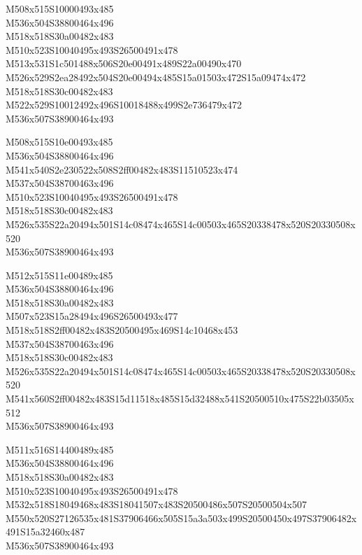 \documentclass{article}
\begin{document}
\begin{multicols}{5}
\begin{center}

M508x515S10000493x485 %
\\M536x504S38800464x496 %
\\M518x518S30a00482x483 %
\\M510x523S10040495x493S26500491x478 %
\\M513x531S1c501488x506S20e00491x489S22a00490x470 %
\\M526x529S2ea28492x504S20e00494x485S15a01503x472S15a09474x472 %
\\M518x518S30c00482x483 %
\\M522x529S10012492x496S10018488x499S2e736479x472 %
\\M536x507S38900464x493 %
\vfil
\columnbreak

M508x515S10e00493x485 %
\\M536x504S38800464x496 %
\\M541x540S2e230522x508S2ff00482x483S11510523x474 %
\\M537x504S38700463x496 %
\\M510x523S10040495x493S26500491x478 %
\\M518x518S30c00482x483 %
\\M526x535S22a20494x501S14c08474x465S14c00503x465S20338478x520S20330508x520 %
\\M536x507S38900464x493 %
\vfil
\columnbreak

M512x515S11e00489x485 %
\\M536x504S38800464x496 %
\\M518x518S30a00482x483 %
\\M507x523S15a28494x496S26500493x477 %
\\M518x518S2ff00482x483S20500495x469S14c10468x453 %
\\M537x504S38700463x496 %
\\M518x518S30c00482x483 %
\\M526x535S22a20494x501S14c08474x465S14c00503x465S20338478x520S20330508x520 %
\\M541x560S2ff00482x483S15d11518x485S15d32488x541S20500510x475S22b03505x512 %
\\M536x507S38900464x493 %
\vfil
\columnbreak

M511x516S14400489x485 %
\\M536x504S38800464x496 %
\\M518x518S30a00482x483 %
\\M510x523S10040495x493S26500491x478 %
\\M532x518S18049468x483S18041507x483S20500486x507S20500504x507 %
\\M550x520S27126535x481S37906466x505S15a3a503x499S20500450x497S37906482x491S15a32460x487 %
\\M536x507S38900464x493 %
\vfil
\columnbreak


\end{center}
\end{multicols}
\end{document}
